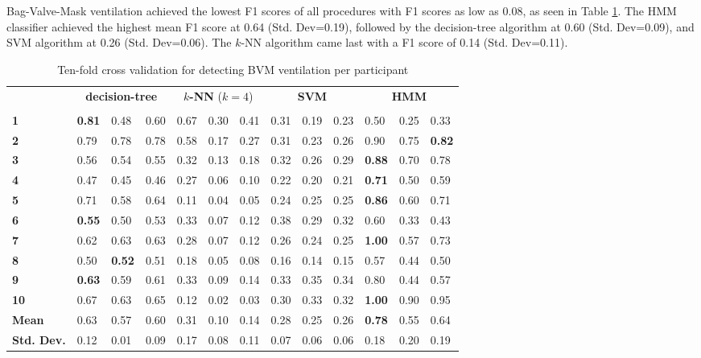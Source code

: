 \par Bag-Valve-Mask ventilation achieved the lowest F1 scores of all procedures with F1 scores as low as 0.08, as seen in Table \ref{tab:bvm:ml}. The HMM classifier achieved the highest mean F1 score at 0.64 (Std. Dev=0.19), followed by the decision-tree algorithm at 0.60 (Std. Dev=0.09), and SVM algorithm at 0.26 (Std. Dev=0.06). The $k$-NN algorithm came last with a F1 score of 0.14 (Std. Dev=0.11).
\begin{table}[h]
	\centering
	\begin{tabular}{lllllllllllll}
		\multirow{2}{*}{\rotatebox[origin=c]{45}{\textbf{Participant}}}& \multicolumn{3}{c}{\textbf{decision-tree}} & \multicolumn{3}{c}{\textbf{$k$-NN} ($k=4$)} & \multicolumn{3}{c}{\textbf{SVM}} & \multicolumn{3}{c}{\textbf{HMM}} \\
		& \rot{Precision}     & \rot{Recall}    & \rot{F1}    & \rot{Precision}     & \rot{Recall}    & \rot{F1}  & \rot{Precision}     & \rot{Recall}    & \rot{F1} & \rot{Precision}     & \rot{Recall}    & \rot{F1} \\
		\textbf{1}   & \textbf{0.81} & 0.48 & 0.60 & 0.67 & 0.30 & 0.41 & 0.31 & 0.19 & 0.23 & 0.50 & 0.25 & 0.33 \\
		\textbf{2}   & 0.79 & 0.78 & 0.78 & 0.58 & 0.17 & 0.27 & 0.31 & 0.23 & 0.26 & 0.90 & 0.75 & \textbf{0.82} \\
		\textbf{3}   & 0.56 & 0.54 & 0.55 & 0.32 & 0.13 & 0.18 & 0.32 & 0.26 & 0.29 & \textbf{0.88} & 0.70 & 0.78 \\
		\textbf{4}   & 0.47 & 0.45 & 0.46 & 0.27 & 0.06 & 0.10 & 0.22 & 0.20 & 0.21 & \textbf{0.71} & 0.50 & 0.59 \\
		\textbf{5}   & 0.71 & 0.58 & 0.64 & 0.11 & 0.04 & 0.05 & 0.24 & 0.25 & 0.25 & \textbf{0.86} & 0.60 & 0.71 \\
		\textbf{6}   & \textbf{0.55} & 0.50 & 0.53 & 0.33 & 0.07 & 0.12 & 0.38 & 0.29 & 0.32 & 0.60 & 0.33 & 0.43 \\
		\textbf{7}   & 0.62 & 0.63 & 0.63 & 0.28 & 0.07 & 0.12 & 0.26 & 0.24 & 0.25 & \textbf{1.00} & 0.57 & 0.73 \\
		\textbf{8}   & 0.50 & \textbf{0.52} & 0.51 & 0.18 & 0.05 & 0.08 & 0.16 & 0.14 & 0.15 & 0.57 & 0.44 & 0.50 \\
		\textbf{9}   & \textbf{0.63} & 0.59 & 0.61 & 0.33 & 0.09 & 0.14 & 0.33 & 0.35 & 0.34 & 0.80 & 0.44 & 0.57 \\
		\textbf{10} & 0.67 & 0.63 & 0.65 & 0.12 & 0.02 & 0.03 & 0.30 & 0.33 & 0.32 & \textbf{1.00} & 0.90 & 0.95 \\
		\hline
		\textbf{Mean} & 0.63 & 0.57 & 0.60 & 0.31 & 0.10 & 0.14 & 0.28 & 0.25 & 0.26 & \textbf{0.78} & 0.55 & 0.64 \\
		\textbf{Std. Dev.} & 0.12 & 0.01 & 0.09 & 0.17 & 0.08 & 0.11 & 0.07 & 0.06 & 0.06 & 0.18 & 0.20 & 0.19
	\end{tabular}
	\caption{Ten-fold cross validation for detecting BVM ventilation per participant}
	\label{tab:bvm:ml}
\end{table}

